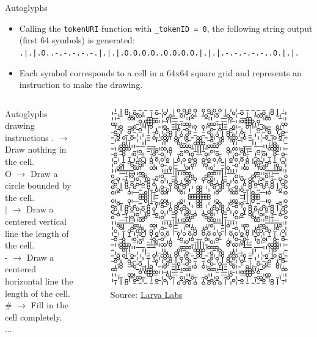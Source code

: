 \documentclass[handout]{beamer}
\begin{document}
\begin{frame}{Autoglyphs}
	\begin{itemize}
		\item Calling the \texttt{tokenURI} function with \texttt{\_tokenID = 0}, the following string output (first 64 symbols) is generated: {\scriptsize \texttt{.|.|.O..-.-.-.-.-.|.|.|.O.O.O.O..O.O.O.O.|.|.|.-.-.-.-.-..O.|.|.}}
		\item Each symbol corresponds to a cell in a 64x64 square grid and represents an instruction to make the drawing.
	\end{itemize}
	\begin{columns}
			\begin{samplecode}{Autoglyphs drawing instructions}
				.  $\rightarrow$ Draw nothing in the cell.\\
 				O  $\rightarrow$ Draw a circle bounded by the cell.\\
				|  $\rightarrow$ Draw a centered vertical line the length of the cell.\\
 				- $\rightarrow$  Draw a centered horizontal line the length of the cell.\\
 				\# $\rightarrow$ Fill in the cell completely. \\
 				 ...
			\end{samplecode}
			\begin{figure}
				\center
				\vspace{-0.5em}
				\includegraphics[scale=0.2]{../assets/images/glyph1.png}
				\caption*{Source: \link \href{https://larvalabs.com/autoglyphs/glyph?index=1}{Larva Labs}}	
			\end{figure}
	\end{columns}
\end{frame}
\end{document}
